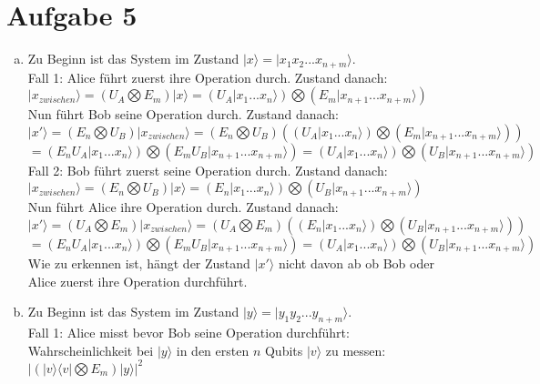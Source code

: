 \documentclass[a4paper]{scrartcl}
\begin{document}
\section*{Aufgabe 5}
\begin{enumerate}[a)]

\item Zu Beginn ist das System im Zustand $|x\rangle =|x_1x_2...x_{n+m}\rangle$. \\
Fall 1: Alice führt zuerst ihre Operation durch. Zustand danach:\\
$|x_{zwischen}\rangle=(U_A\bigotimes E_{m})|x\rangle = (U_A|x_1...x_n\rangle)\bigotimes (E_{m}|x_{n+1}...x_{n+m}\rangle)$\\
Nun führt Bob seine Operation durch. Zustand danach:\\
$|x'\rangle = (E_n\bigotimes U_B)|x_{zwischen}\rangle= (E_n\bigotimes U_B) ((U_A|x_1...x_n\rangle)\bigotimes (E_{m}|x_{n+1}...x_{n+m}\rangle))$\\
$= (E_nU_A|x_1...x_n\rangle)\bigotimes (E_mU_B|x_{n+1}...x_{n+m}\rangle)=(U_A|x_1...x_n\rangle)\bigotimes (U_B|x_{n+1}...x_{n+m}\rangle) $\\

\noindent Fall 2: Bob führt zuerst seine Operation durch. Zustand danach:\\
$|x_{zwischen}\rangle=(E_n \bigotimes U_B)|x\rangle = (E_n|x_1...x_n\rangle)\bigotimes (U_B|x_{n+1}...x_{n+m}\rangle)$\\
Nun führt Alice ihre Operation durch. Zustand danach:\\
$|x'\rangle = (U_A\bigotimes E_m)|x_{zwischen}\rangle= (U_A\bigotimes E_m) ((E_n|x_1...x_n\rangle)\bigotimes (U_B|x_{n+1}...x_{n+m}\rangle))$\\
$= (E_nU_A|x_1...x_n\rangle)\bigotimes (E_mU_B|x_{n+1}...x_{n+m}\rangle)=(U_A|x_1...x_n\rangle)\bigotimes (U_B|x_{n+1}...x_{n+m}\rangle)$\\
Wie zu erkennen ist, hängt der Zustand $|x'\rangle$ nicht davon ab ob Bob oder Alice zuerst ihre Operation durchführt.

\item Zu Beginn ist das System im Zustand $|y\rangle =|y_1y_2...y_{n+m}\rangle$. \\
Fall 1: Alice misst bevor Bob seine Operation durchführt:\\
Wahrscheinlichkeit bei $|y\rangle$ in den ersten $n$ Qubits $|v\rangle$ zu messen: $|(|v\rangle \langle v|\bigotimes E_m)|y\rangle|^2$\\


\end{enumerate}
\end{document}
